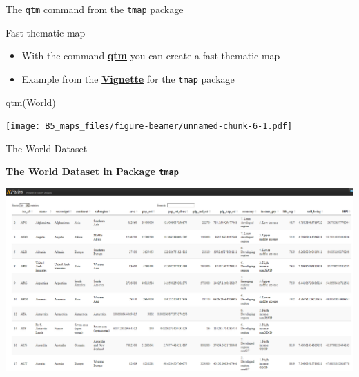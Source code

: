 \documentclass[
  10pt,
  ignorenonframetext,
]{beamer}
\newenvironment{Shaded}{\begin{snugshade}}{\end{snugshade}}
\newcommand{\KeywordTok}[1]{\textcolor[rgb]{0.94,0.87,0.69}{#1}}
\newcommand{\NormalTok}[1]{\textcolor[rgb]{0.80,0.80,0.80}{#1}}
\begin{document}
\begin{frame}[fragile]{The \texttt{qtm} command from the \texttt{tmap}
package}
\protect\hypertarget{the-qtm-command-from-the-tmap-package}{}

\begin{block}{Fast thematic map}

\begin{itemize}
\item
  With the command
  \href{https://cran.r-project.org/web/packages/tmap/vignettes/tmap-nutshell.html}{\textbf{qtm}}
  you can create a fast thematic map
\item
  Example from the
  \href{https://cran.r-project.org/web/packages/tmap/vignettes/tmap-nutshell.html}{\textbf{Vignette}}
  for the \texttt{tmap} package
\end{itemize}

\begin{Shaded}
\begin{Highlighting}[]
\KeywordTok{qtm}\NormalTok{(World)}
\end{Highlighting}
\end{Shaded}

\texttt{[image: B5\_maps\_files/figure-beamer/unnamed-chunk-6-1.pdf]}

\end{block}

\end{frame}

\begin{frame}[fragile]{The World-Dataset}
\protect\hypertarget{the-world-dataset-1}{}

\begin{block}{\href{http://rpubs.com/Japhilko82/tmap_europe_dataset}{\textbf{The
World Dataset in Package \texttt{tmap}}}}

\includegraphics{figure/tmap_world.PNG}

\end{block}

\end{frame}
\end{document}
